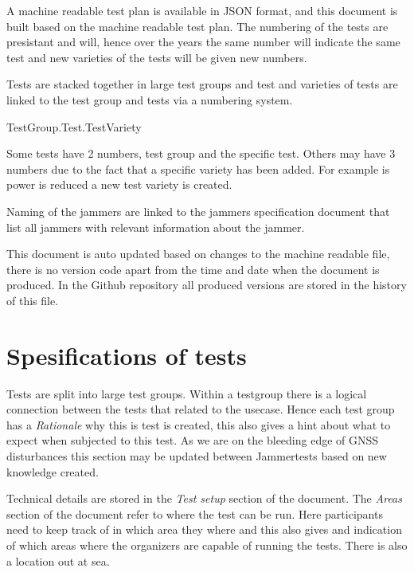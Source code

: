 \documentclass[a4paper]{book}
\begin{document}
A machine readable test plan is available in JSON format, and this document is built based on the machine readable test plan. The numbering of the tests are presistant and will, hence over the years the same number will indicate the same test and new varieties of the tests will be given new numbers.

Tests are stacked together in large test groups and test and varieties of tests are linked to the test group and tests via a numbering system.

TestGroup.Test.TestVariety

Some tests have 2 numbers, test group and the specific test. Others may have 3 numbers due to the fact that a specific variety has been added. For example is power is reduced a new test variety is created.


Naming of the jammers are linked to the jammers specification document that list all jammers with relevant information about the jammer.

This document is auto updated based on changes to the machine readable file, there is no version code apart from the time and date when the document is produced. In the Github repository all produced versions are stored in the history of this file.

\section{Spesifications of tests}
Tests are split into large test groups. Within a testgroup there is a logical connection between the tests that related to the usecase. Hence each test group has a \textit{Rationale} why this is test is created, this also gives a hint about what to expect when subjected to this test. As we are on the bleeding edge of GNSS disturbances this section may be updated between Jammertests based on new knowledge created. 

Technical details are stored in the \textit{Test setup} section of the document. The \textit{Areas} section of the document refer to where the test can be run. Here participants need to keep track of in which area they where and this also gives and indication of which areas where the organizers are capable of running the tests. There is also a location out at sea.
\end{document}
